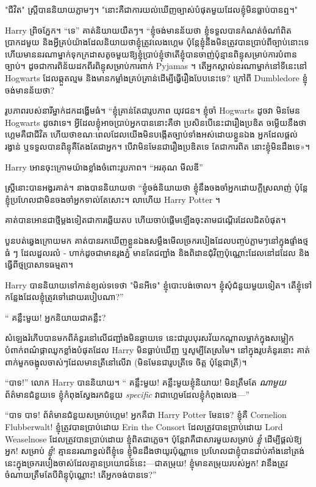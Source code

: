 "ជីវិត" ស្ត្រីបាននិយាយភ្លាមៗ។ "នោះ​គឺ​ជា​ការ​យល់​ឃើញ​ច្បាស់​បំផុត​មួយ​ដែល​ខ្ញុំ​មិន​ធ្លាប់​បាន​ឮ។"

Harry ព្រិចភ្នែក។ “ទេ” គាត់និយាយយឺតៗ។ “ខ្ញុំចង់មានន័យថា ខ្ញុំទទួលបានកំណត់ចំណាំពិតប្រាកដមួយ និងអ្វីគ្រប់យ៉ាងដែលនិយាយថាខ្ញុំត្រូវលេងហ្គេម ប៉ុន្តែខ្ញុំនឹងមិនត្រូវបានប្រាប់ពីច្បាប់នោះទេ ហើយមាននរណាម្នាក់ទុកក្រដាសតូចមួយឱ្យខ្ញុំប្រាប់ខ្ញុំថាតើខ្ញុំបានចាញ់ប៉ុន្មានពិន្ទុសម្រាប់ការបំពានច្បាប់។ ដូចជាការពិន័យដកពីរពិន្ទុសម្រាប់ការពាក់ Pyjamas ។ តើអ្នកស្គាល់នរណាម្នាក់នៅទីនេះនៅ Hogwarts ដែលឆ្កួតល្មម និងមានកម្លាំងគ្រប់គ្រាន់ដើម្បីធ្វើរឿងបែបនេះទេ? ក្រៅ​ពី Dumbledore ខ្ញុំ​ចង់​មាន​ន័យ​ថា?

រូបភាពរបស់នារីម្នាក់ដកដង្ហើមធំ។ “ខ្ញុំគ្រាន់តែជារូបភាព យុវជន។ ខ្ញុំចាំ Hogwarts ដូចវា មិនមែន Hogwarts ដូចវាទេ។ អ្វីដែលខ្ញុំអាចប្រាប់អ្នកបាននោះគឺថា ប្រសិនបើនេះជារឿងប្រឌិត ចម្លើយនឹងថាហ្គេមគឺជាជីវិត ហើយថាខណៈពេលដែលយើងមិនបង្កើតច្បាប់ទាំងអស់ដោយខ្លួនឯង អ្នកដែលផ្តល់រង្វាន់ ឬទទួលបានពិន្ទុគឺតែងតែជាអ្នក។ បើ​វា​មិន​មែន​ជា​រឿង​ប្រឌិត​ទេ តែ​ជា​ការ​ពិត នោះ​ខ្ញុំ​មិន​ដឹង​ទេ»។

Harry អោន​ចុះ​ក្រោម​យ៉ាង​ខ្លាំង​ចំពោះ​រូបភាព។ “អរគុណ មីលឌី”

ស្ត្រី​នោះ​បាន​អង្វរ​គាត់។ នាងបាននិយាយថា “ខ្ញុំចង់និយាយថា ខ្ញុំនឹងចងចាំអ្នកដោយក្តីស្រលាញ់ ប៉ុន្តែខ្ញុំប្រហែលជាមិនចងចាំអ្នកទាល់តែសោះ។ លាហើយ Harry Potter ។

គាត់​បាន​អោន​ជា​ថ្មី​ម្តង​ទៀត​ជា​ការ​ឆ្លើយ​តប ហើយ​ចាប់​ផ្តើម​ឡើង​ចុះ​តាម​ជណ្តើរ​ដែល​ជិត​បំផុត។

បួនបត់ឆ្វេងក្រោយមក គាត់បានរកឃើញខ្លួនឯងសម្លឹងមើលច្រករបៀងដែលបញ្ចប់ភ្លាមៗនៅក្នុងផ្ទាំងថ្មធំ ៗ ដែលដួលរលំ - ហាក់ដូចជាមានរូងភ្នំ មានតែជញ្ជាំង និងពិដានជុំវិញប៉ុណ្ណោះដែលនៅដដែល និងធ្វើពីថ្មប្រាសាទធម្មតា។

Harry បាននិយាយទៅកាន់ខ្យល់ទទេថា "មិនអីទេ" ខ្ញុំបោះបង់ចោល។ ខ្ញុំសុំជំនួយមួយទៀត។ តើខ្ញុំទៅកន្លែងដែលខ្ញុំត្រូវទៅដោយរបៀបណា?”

“ គន្លឹះមួយ! អ្នក​និយាយ​ជា​គន្លឹះ?

សំឡេងរំភើបបានមកពីគំនូរនៅលើជញ្ជាំងមិនឆ្ងាយទេ នេះជារូបបុរសវ័យកណ្តាលម្នាក់ក្នុងសម្លៀកបំពាក់ពណ៌ផ្កាឈូកខ្លាំងបំផុតដែល Harry មិនធ្លាប់ឃើញ ឬសូម្បីតែស្រមៃ។ នៅក្នុងរូបគំនូរនោះ គាត់ពាក់មួកចង្អុលចាស់ៗដែលមានត្រីនៅលើវា (មិនមែនជារូបត្រីទេ ចិត្ត ប៉ុន្តែជាត្រី)។

“បាទ!” លោក Harry បាននិយាយ។ “ គន្លឹះមួយ! គន្លឹះមួយខ្ញុំនិយាយ! មិនត្រឹមតែ \emph{ណាមួយ} ព័ត៌មានជំនួយទេ ខ្ញុំកំពុងស្វែងរកជំនួយ \emph{specific} វាជាហ្គេមដែលខ្ញុំកំពុងលេង—”

“បាទ បាទ! ព័ត៌មានជំនួយសម្រាប់ហ្គេម! អ្នកគឺជា Harry Potter មែនទេ? ខ្ញុំគឺ Cornelion Flubberwalt! ខ្ញុំត្រូវបានប្រាប់ដោយ Erin the Consort ដែលត្រូវបានប្រាប់ដោយ Lord Weaselnose ដែលត្រូវបានប្រាប់ដោយ ខ្ញុំពិតជាភ្លេច។ ប៉ុន្តែវាគឺជាសារមួយសម្រាប់ \emph{ខ្ញុំ} ដើម្បីផ្តល់ឱ្យអ្នក! សម្រាប់ \emph{ខ្ញុំ}! គ្មាន​នរណា​ខ្វល់​ពី​ខ្ញុំ​ទេ ខ្ញុំ​មិន​ដឹង​ថា​យូរ​ប៉ុណ្ណា​ទេ ប្រហែល​ជា​ខ្ញុំ​បាន​ជាប់​គាំង​នៅ​ត្រង់​នេះ​ក្នុង​ច្រក​របៀង​ចាស់​ដែល​គ្មាន​ប្រយោជន៍​នេះ—ជា​តម្រុយ! ខ្ញុំមានតម្រុយរបស់អ្នក! វានឹងត្រូវចំណាយត្រឹមតែបីពិន្ទុប៉ុណ្ណោះ! តើអ្នកចង់បានទេ?”

